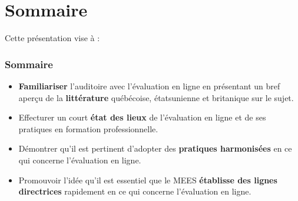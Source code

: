 \documentclass{beamer}
\begin{document}
	\section{Sommaire} 
		\begin{frame}
			Cette présentation vise à :
			\frametitle{Sommaire}
			\begin {itemize}
				\item \textbf{Familiariser} l'auditoire avec l'évaluation en ligne en présentant un bref aperçu de la \textbf{littérature} québécoise, étatsunienne et britanique sur le sujet.
				\item Effecturer un court \textbf{état des lieux} de l'évaluation en ligne et de ses pratiques en formation professionnelle.
				\item Démontrer qu'il est pertinent d'adopter des \textbf{pratiques harmonisées} en ce qui concerne l'évaluation en ligne.
				\item Promouvoir l'idée qu'il est essentiel que le MEES \textbf{établisse des lignes directrices} rapidement en ce qui concerne l'évaluation en ligne.

			\end{itemize}
		\end{frame}
\end{document}

